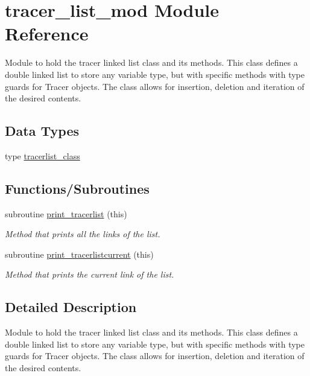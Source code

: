 \hypertarget{namespacetracer__list__mod}{}\section{tracer\+\_\+list\+\_\+mod Module Reference}
\label{namespacetracer__list__mod}


Module to hold the tracer linked list class and its methods. This class defines a double linked list to store any variable type, but with specific methods with type guards for Tracer objects. The class allows for insertion, deletion and iteration of the desired contents.  


\subsection*{Data Types}
\begin{DoxyCompactItemize}
\item 
type \mbox{\hyperlink{structtracer__list__mod_1_1tracerlist__class}{tracerlist\+\_\+class}}
\end{DoxyCompactItemize}
\subsection*{Functions/\+Subroutines}
\begin{DoxyCompactItemize}
\item 
subroutine \mbox{\hyperlink{namespacetracer__list__mod_a53919fa88a10347294eb6f2fccf072c7}{print\+\_\+tracerlist}} (this)
\begin{DoxyCompactList}\small\item\em Method that prints all the links of the list. \end{DoxyCompactList}\item 
subroutine \mbox{\hyperlink{namespacetracer__list__mod_a8c123eab5e919438e71cfc0b3847d384}{print\+\_\+tracerlistcurrent}} (this)
\begin{DoxyCompactList}\small\item\em Method that prints the current link of the list. \end{DoxyCompactList}\end{DoxyCompactItemize}


\subsection{Detailed Description}
Module to hold the tracer linked list class and its methods. This class defines a double linked list to store any variable type, but with specific methods with type guards for Tracer objects. The class allows for insertion, deletion and iteration of the desired contents. 

